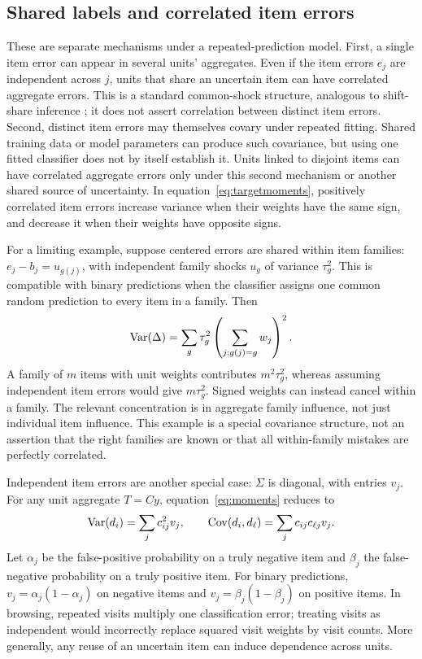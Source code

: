 \subsection{Shared labels and correlated item errors}
These are separate mechanisms under a repeated-prediction model. First, a
single item error can appear in several units' aggregates. Even if the item
errors $e_j$ are independent across $j$, units that share an uncertain item
can have correlated aggregate errors. This is a standard common-shock
structure, analogous to shift-share inference \citep{adao2019}; it does not
assert correlation between distinct item errors. Second, distinct item errors
may themselves covary under repeated fitting. Shared training data or model
parameters can produce such covariance, but using one fitted classifier does
not by itself establish it. Units linked to disjoint items can have
correlated aggregate errors only under this second mechanism or another
shared source of uncertainty. In equation~\eqref{eq:targetmoments}, positively
correlated item errors increase variance when their weights have the same
sign, and decrease it when their weights have opposite signs.

For a limiting example, suppose centered errors are shared within item
families: $e_j-b_j=u_{g(j)}$, with independent family shocks $u_g$ of variance
$\tau_g^2$. This is compatible with binary predictions when the classifier
assigns one common random prediction to every item in a family. Then
\begin{equation}\label{eq:families}
 \operatorname{Var}(\Delta)=\sum_g\tau_g^2
                 \left(\sum_{j:g(j)=g}w_j\right)^2.
\end{equation}
A family of $m$ items with unit weights contributes $m^2\tau_g^2$, whereas
assuming independent item errors would give $m\tau_g^2$. Signed weights can
instead cancel within a family. The relevant concentration is in aggregate
family influence, not just individual item influence. This example is a
special covariance structure, not an assertion that the right families are
known or that all within-family mistakes are perfectly correlated.

Independent item errors are another special case: $\Sigma$ is diagonal,
with entries $v_j$. For any unit aggregate $T=Cy$,
equation~\eqref{eq:moments} reduces to
\begin{equation}\label{eq:covariance}
 \operatorname{Var}(d_i)=\sum_jc_{ij}^2v_j,\qquad
 \operatorname{Cov}(d_i,d_\ell)=\sum_jc_{ij}c_{\ell j}v_j.
\end{equation}
Let $\alpha_j$ be the false-positive probability on a truly negative item
and $\beta_j$ the false-negative probability on a truly positive item.
For binary predictions, $v_j=\alpha_j(1-\alpha_j)$ on negative items and
$v_j=\beta_j(1-\beta_j)$ on positive items. In browsing, repeated visits multiply one
classification error; treating visits as independent would incorrectly replace
squared visit weights by visit counts. More generally, any reuse of an
uncertain item can induce dependence across units.


